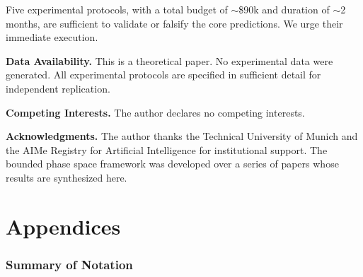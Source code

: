 \documentclass[11pt,twocolumn,a4paper]{article}
\theoremstyle{plain}
\theoremstyle{definition}
\theoremstyle{remark}
\begin{document}
Five experimental protocols, with a total budget of $\sim$\$90k and duration of $\sim$2 months, are sufficient to validate or falsify the core predictions. We urge their immediate execution.

\bigskip
\noindent\textbf{Data Availability.} This is a theoretical paper. No experimental data were generated. All experimental protocols are specified in sufficient detail for independent replication.

\bigskip
\noindent\textbf{Competing Interests.} The author declares no competing interests.

\bigskip
\noindent\textbf{Acknowledgments.} The author thanks the Technical University of Munich and the AIMe Registry for Artificial Intelligence for institutional support. The bounded phase space framework was developed over a series of papers \cite{sachikonye2026poincare, sachikonye2026partition, sachikonye2026single, sachikonye2026counting, sachikonye2026depth} whose results are synthesized here.








\appendix

\part*{Appendices}

\section{Summary of Notation}
\label{app:notation}
\end{document}
